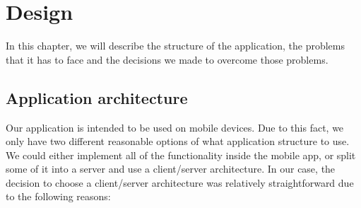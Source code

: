 \chapter{Design}

In this chapter, we will describe the structure of the application, the problems that it has to face and the decisions we made to overcome those problems. 

\section{Application architecture}

Our application is intended to be used on mobile devices. Due to this fact, we only have two different reasonable options of what application structure to use. We could either implement all of the functionality inside the mobile app, or split some of it into a server and use a client/server architecture. In our case, the decision to choose a client/server architecture was relatively straightforward due to the following reasons:

